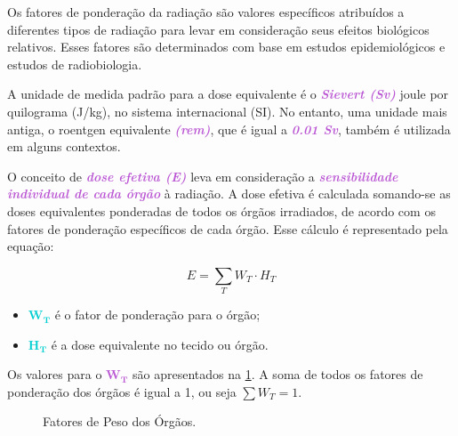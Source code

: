 \documentclass[11pt,a4paper]{article}
\newcounter{exemplo}
\begin{document}
	Os fatores de ponderação da radiação são valores específicos atribuídos a diferentes tipos de radiação para levar em consideração seus efeitos biológicos relativos. Esses fatores são determinados com base em estudos epidemiológicos e estudos de radiobiologia.

	A unidade de medida padrão para a dose equivalente é o \textcolor{MediumOrchid}{\textbf{\textit{Sievert (Sv)}}} joule por quilograma (J/kg), no sistema internacional (SI). No entanto, uma unidade mais antiga, o roentgen equivalente \textcolor{MediumOrchid}{\textbf{\textit{(rem)}}}, que é igual a \textcolor{MediumOrchid}{\textbf{\textit{0.01 Sv}}}, também é utilizada em alguns contextos.
	
	O conceito de \textcolor{MediumOrchid}{\textbf{\textit{dose efetiva (E)}}} leva em consideração a \textcolor{MediumOrchid}{\textbf{\textit{sensibilidade individual de cada órgão}}} à radiação. A dose efetiva é calculada somando-se as doses equivalentes ponderadas de todos os órgãos irradiados, de acordo com os fatores de ponderação específicos de cada órgão. Esse cálculo é representado pela equação:

		\begin{equation}
			E = \sum_T W_T \cdot H_T
		\end{equation}

		\begin{exemplo}[onde,]
			\begin{itemize}
				\item \textcolor{DarkTurquoise}{$\mathbf{W_T}$} é o fator de ponderação para o órgão;
				\item \textcolor{DarkTurquoise}{$\mathbf{H_T}$} é a dose equivalente no tecido ou órgão.
			\end{itemize}
		\end{exemplo}

	Os valores para o \textcolor{MediumOrchid}{$\mathbf{W_T}$} são apresentados na \ref{fig:prFatorPesoOrgao}. A soma de todos os fatores de ponderação dos órgãos é igual a 1, ou seja $\sum W_T = 1$.

	\begin{figure}[!h]
			\centering
			\caption{Fatores de Peso dos Órgãos.}
			\label{fig:prFatorPesoOrgao}
	\end{figure}
\end{document}
